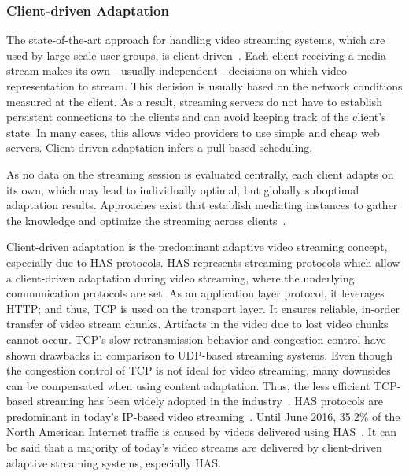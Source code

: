 \subsubsection{Client-driven Adaptation}
The state-of-the-art approach for handling video streaming systems, which are used by large-scale user groups, is client-driven~\cite{Akhshabi2011,Sandvine2016}.
Each client receiving a media stream makes its own - usually independent - decisions on which video representation to stream.
This decision is usually based on the network conditions measured at the client.
As a result, streaming servers do not have to establish persistent connections to the clients and can avoid keeping track of the client's state.
In many cases, this allows video providers to use simple and cheap web servers.
Client-driven adaptation infers a pull-based scheduling.

As no data on the streaming session is evaluated centrally, each client adapts on its own, which may lead to individually optimal, but globally suboptimal adaptation results.
Approaches exist that establish mediating instances to gather the knowledge and optimize the streaming across clients~\cite{Thomas2016}.

Client-driven adaptation is the predominant adaptive video streaming concept, especially due to \ac{HAS} protocols.
\ac{HAS} represents streaming protocols which allow a client-driven adaptation during video streaming, where the underlying communication protocols are set.
As an application layer protocol, it leverages \ac{HTTP}; and thus, \ac{TCP} is used on the transport layer. 
It ensures reliable, in-order transfer of video stream chunks.
Artifacts in the video due to lost video chunks cannot occur.
\ac{TCP}'s slow retransmission behavior and congestion control have shown drawbacks in comparison to \ac{UDP}-based streaming systems.
Even though the congestion control of \ac{TCP} is not ideal for video streaming, many downsides can be compensated when using content adaptation.
Thus, the less efficient \ac{TCP}-based streaming has been widely adopted in the industry~\cite{Akhshabi2011}.
\ac{HAS} protocols are predominant in today's \ac{IP}-based video streaming~\cite{Akhshabi2011}.
Until June 2016, 35.2\% of the North American Internet traffic is caused by videos delivered using \ac{HAS}~\cite{Sandvine2016}.
It can be said that a majority of today's video streams are delivered by client-driven adaptive streaming systems, especially \ac{HAS}.
